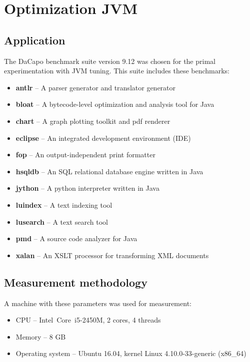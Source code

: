 \documentclass[
  digital, %
  oneside,
  notable, %
  nolof,     %
  nolot     %
]{fithesis3}
\begin{document}





\chapter{Optimization JVM}

\section{Application}
The DaCapo benchmark suite version 9.12 was chosen for the primal experimentation with JVM tuning. This suite includes these benchmarks: \cite{DaCapo:paper}
\begin{itemize}
	\item \textbf{antlr} -- A parser generator and translator generator
	\item \textbf{bloat} -- A bytecode-level optimization and analysis tool for Java
	\item \textbf{chart} -- A graph plotting toolkit and pdf renderer
	\item \textbf{eclipse} -- An integrated development environment (IDE)
	\item \textbf{fop} -- An output-independent print formatter
	\item \textbf{hsqldb} -- An SQL relational database engine written in Java
	\item \textbf{jython} -- A python interpreter written in Java
	\item \textbf{luindex} -- A text indexing tool
	\item \textbf{lusearch} -- A text search tool
	\item \textbf{pmd} -- A source code analyzer for Java
	\item \textbf{xalan} -- An XSLT processor for transforming XML documents
\end{itemize}
\section{Measurement methodology}
A machine with these parameters was used for measurement:
\begin{itemize}
	\item CPU -- Intel\textregistered\ Core\texttrademark\ i5-2450M, 2 cores, 4 threads
	\item Memory -- 8 GB
	\item Operating system -- Ubuntu 16.04, kernel Linux 4.10.0-33-generic (x86\_64)
\end{itemize}
\end{document}
